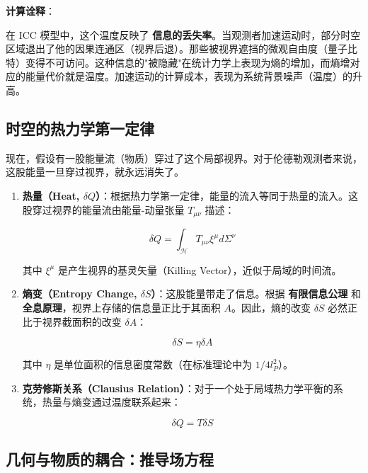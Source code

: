 \textbf{计算诠释}：

在 ICC 模型中，这个温度反映了 \textbf{信息的丢失率}。当观测者加速运动时，部分时空区域退出了他的因果连通区（视界后退）。那些被视界遮挡的微观自由度（量子比特）变得不可访问。这种信息的"被隐藏"在统计力学上表现为熵的增加，而熵增对应的能量代价就是温度。加速运动的计算成本，表现为系统背景噪声（温度）的升高。

\subsection{时空的热力学第一定律}

现在，假设有一股能量流（物质）穿过了这个局部视界。对于伦德勒观测者来说，这股能量一旦穿过视界，就永远消失了。

\begin{enumerate}
\item \textbf{热量（Heat, $\delta Q$）}：根据热力学第一定律，能量的流入等同于热量的流入。这股穿过视界的能量流由能量-动量张量 $T_{\mu\nu}$ 描述：

    \begin{equation}
    \delta Q = \int_{\mathcal{H}} T_{\mu\nu} \xi^{\mu} d\Sigma^{\nu}
    \end{equation}

    其中 $\xi^{\mu}$ 是产生视界的基灵矢量（Killing Vector），近似于局域的时间流。

\item \textbf{熵变（Entropy Change, $\delta S$）}：这股能量带走了信息。根据 \textbf{有限信息公理} 和 \textbf{全息原理}，视界上存储的信息量正比于其面积 $A$。因此，熵的改变 $\delta S$ 必然正比于视界截面积的改变 $\delta A$：

    \begin{equation}
    \delta S = \eta \delta A
    \end{equation}

    其中 $\eta$ 是单位面积的信息密度常数（在标准理论中为 $1/4l_P^2$）。

\item \textbf{克劳修斯关系（Clausius Relation）}：对于一个处于局域热力学平衡的系统，热量与熵变通过温度联系起来：

    \begin{equation}
    \delta Q = T \delta S
    \end{equation}
\end{enumerate}

\subsection{几何与物质的耦合：推导场方程}

